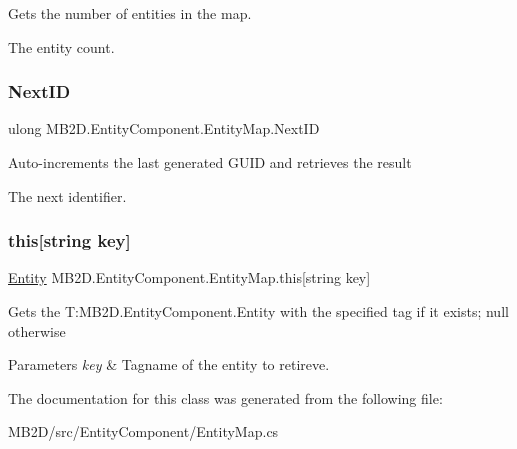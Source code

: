 Gets the number of entities in the map. 

The entity count.\hypertarget{class_m_b2_d_1_1_entity_component_1_1_entity_map_a812155313251122f297b6653ab4f4ec1}{}\label{class_m_b2_d_1_1_entity_component_1_1_entity_map_a812155313251122f297b6653ab4f4ec1} 
\subsubsection{\texorpdfstring{Next\+ID}{NextID}}
{\footnotesize\ttfamily ulong M\+B2\+D.\+Entity\+Component.\+Entity\+Map.\+Next\+ID\hspace{0.3cm}{\ttfamily [get]}}



Auto-\/increments the last generated G\+U\+ID and retrieves the result 

The next identifier.\hypertarget{class_m_b2_d_1_1_entity_component_1_1_entity_map_ae29ad08673cc4c756b43bd3a72c35b84}{}\label{class_m_b2_d_1_1_entity_component_1_1_entity_map_ae29ad08673cc4c756b43bd3a72c35b84} 
\subsubsection{\texorpdfstring{this[string key]}{this[string key]}}
{\footnotesize\ttfamily \hyperlink{class_m_b2_d_1_1_entity_component_1_1_entity}{Entity} M\+B2\+D.\+Entity\+Component.\+Entity\+Map.\+this\mbox{[}string key\mbox{]}\hspace{0.3cm}{\ttfamily [get]}}



Gets the T\+:\+M\+B2\+D.\+Entity\+Component.\+Entity with the specified tag if it exists; null otherwise 


\begin{DoxyParams}{Parameters}
{\em key} & Tagname of the entity to retireve.\\
\hline
\end{DoxyParams}


The documentation for this class was generated from the following file\+:\begin{DoxyCompactItemize}
\item 
M\+B2\+D/src/\+Entity\+Component/Entity\+Map.\+cs\end{DoxyCompactItemize}
